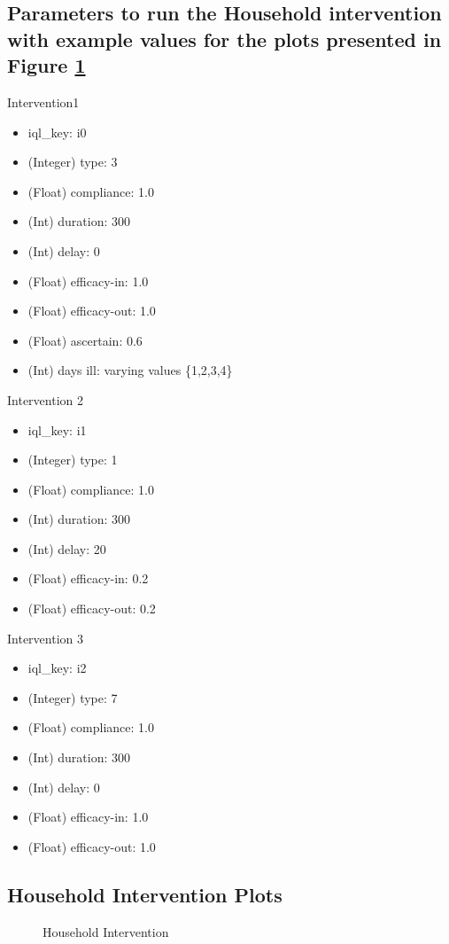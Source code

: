 \documentclass[11pt]{article}
\begin{document}
\subsection{Parameters to run the Household intervention with example values for the plots presented in Figure \ref{fig:house}}
Intervention1
\begin{itemize}
\item iql\_key: i0
\item (Integer) type: 3
\item (Float) compliance: 1.0
\item (Int) duration: 300
\item (Int) delay: 0
\item (Float) efficacy-in: 1.0
\item  (Float) efficacy-out: 1.0
\item (Float) ascertain: 0.6
\item (Int) days ill: varying values \{1,2,3,4\}
\end{itemize}
Intervention 2
\begin{itemize}
\item iql\_key: i1
\item (Integer) type: 1
\item (Float) compliance: 1.0
\item (Int) duration: 300
\item (Int) delay: 20
\item (Float) efficacy-in: 0.2
\item  (Float) efficacy-out: 0.2
\end{itemize}
Intervention 3
\begin{itemize}
\item iql\_key: i2
\item (Integer) type: 7
\item (Float) compliance: 1.0
\item (Int) duration: 300
\item (Int) delay: 0
\item (Float) efficacy-in: 1.0
\item  (Float) efficacy-out: 1.0
\end{itemize}

\subsection{Household Intervention Plots}
\begin{figure}[h]
\caption{Household Intervention}
\label{fig:house}
\end{figure}
\end{document}
